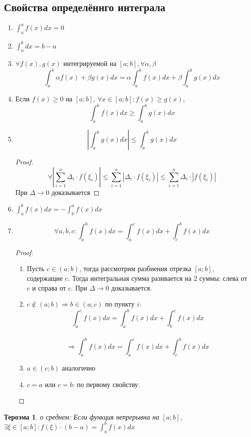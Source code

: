 \documentclass[oneside]{book}
\newtheorem{thm}{Тероэма}[chapter] %
\begin{document}
\begin{enumerate}
\begin{itemize}
\begin{enumerate}
\section[Свойства]{Свойства определённго интеграла}
\begin{enumerate}
  \item $\int_{a}^a f(x) dx = 0$
  \item $\int_{a}^b dx = b-a$
  \item $\forall f(x), g(x)$ интегрируемой на $[a;b], \forall \alpha, \beta$ $$
          \int_{a}^b \alpha f(x) + \beta g(x) dx = \alpha \int_{a}^b f(x) dx + \beta \int_{a}^b g(x) dx
        $$
  \item Если $f(x) \geq 0$ на $[a;b]$, $\forall x \in [a;b]: f(x) \geq g(x)$, $$\int_{a}^b f(x) dx \geq \int_{a}^b g(x) dx$$
  \item $$|\int_{a}^b g(x) dx| \leq \int_{a}^b g(x) dx$$
  \begin{proof}
      $$ \forall |\sum_{i = 1}^n \Delta_i \cdot f(\xi_i)| \leq \sum_{i = 1}^n |\Delta_i \cdot f(\xi_i)| \leq \sum_{i = 1}^n \Delta_i \cdot |f(\xi_i)|$$
      При $\Delta \rightarrow 0$ доказывается
    \end{proof}
  \item $\int_{a}^b f(x) dx = -\int_{b}^a f(x) dx$
  \item $$
    \forall a, b, c: \int_{a}^b f(x) dx = \int_{a}^c f(x) dx + \int_{c}^b f(x) dx
  $$
  \begin{proof}
    \begin{enumerate}
      \item Пусть $c \in (a;b)$, тогда рассмотрим разбиения отрезка $[a;b]$, содержащие $c$. Тогда интегральная сумма разивается на 2 суммы: слева от $c$
      и справа от $c$. При $\Delta \rightarrow 0$ доказывается.
      \item $c \not\in (a;b) \Rightarrow b \in (a;c)$ по пункту $i$:$$
        \int_{a}^c f(x) dx = \int_{a}^b f(x) dx + \int_{b}^c f(x) dx $$\\$$ \Rightarrow \int_{a}^b f(x) dx = \int_{a}^c f(x) dx + \int_{c}^b f(x) dx
      $$
      \item $a \in (c;b)$ аналогично
      \item $c = a$ или $c = b$: по первому свойству.
    \end{enumerate}
  \end{proof}
\end{enumerate}
\begin{thm}
  о среднем: Если функция непрерывна на $[a;b]$, $\exists \xi \in [a;b]: f(\xi) \cdot (b - a) = \int_{a}^b f(x) dx$

\end{thm}
\end{enumerate}
\end{itemize}
\end{enumerate}
\end{document}
